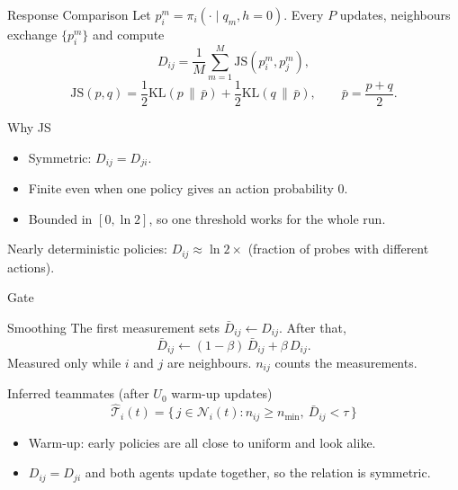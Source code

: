 \documentclass{beamer}
\begin{document}
\begin{frame}{Response Comparison}
  \small
  Let $p_i^m = \pi_i(\cdot \mid q_m, h=0)$. Every $P$ updates, neighbours exchange $\{p_i^m\}$ and compute
  \[
    D_{ij} = \frac{1}{M} \sum_{m=1}^{M} \mathrm{JS}(p_i^m, p_j^m),
  \]
  \[
    \mathrm{JS}(p,q) = \frac{1}{2}\mathrm{KL}(p \,\|\, \bar p) + \frac{1}{2}\mathrm{KL}(q \,\|\, \bar p),
    \qquad \bar p = \frac{p+q}{2}.
  \]

  \begin{block}{Why JS}
    \begin{itemize}
      \item Symmetric: $D_{ij} = D_{ji}$.
      \item Finite even when one policy gives an action probability 0.
      \item Bounded in $[0, \ln 2]$, so one threshold works for the whole run.
    \end{itemize}
  \end{block}
  Nearly deterministic policies: $D_{ij} \approx \ln 2 \times$ (fraction of probes with different actions).
\end{frame}

\begin{frame}{Gate}
  \begin{block}{Smoothing}
    The first measurement sets $\bar D_{ij} \leftarrow D_{ij}$. After that,
    \[
      \bar D_{ij} \leftarrow (1-\beta)\, \bar D_{ij} + \beta\, D_{ij}.
    \]
    Measured only while $i$ and $j$ are neighbours. $n_{ij}$ counts the measurements.
  \end{block}

  \begin{block}{Inferred teammates (after $U_0$ warm-up updates)}
    \[
      \hat{\mathcal{T}}_i(t) = \{\, j \in \mathcal{N}_i(t) : n_{ij} \ge n_{\min},\ \bar D_{ij} < \tau \,\}
    \]
  \end{block}
  \begin{itemize}
    \item Warm-up: early policies are all close to uniform and look alike.
    \item $D_{ij} = D_{ji}$ and both agents update together, so the relation is symmetric.
  \end{itemize}
\end{frame}
\end{document}
